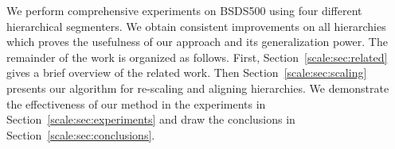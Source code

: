 We perform comprehensive experiments on BSDS500 using four different hierarchical segmenters.
We obtain consistent improvements on all hierarchies which proves the usefulness of our approach and its 
generalization power.
The remainder of the work is organized as follows.
First, Section~\ref{scale:sec:related} gives a brief overview of the related work.
Then Section~\ref{scale:sec:scaling} presents our algorithm for re-scaling and aligning hierarchies.
We demonstrate the effectiveness of our method in the experiments in Section~\ref{scale:sec:experiments} and draw 
the conclusions in Section~\ref{scale:sec:conclusions}.
 

%
%
%


